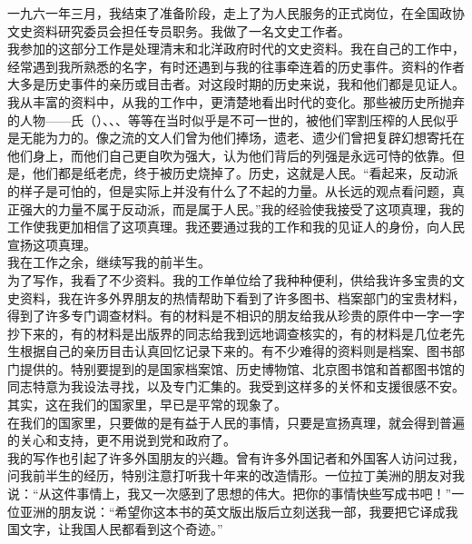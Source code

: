一九六一年三月，我结束了准备阶段，走上了为人民服务的正式岗位，在全国政协文史资料研究委员会担任专员职务。我做了一名文史工作者。\\

我参加的这部分工作是处理清末和北洋政府时代的文史资料。我在自己的工作中，经常遇到我所熟悉的名字，有时还遇到与我的往事牵连着的历史事件。资料的作者大多是历史事件的亲历或目击者。对这段时期的历史来说，我和他们都是见证人。我从丰富的资料中，从我的工作中，更清楚地看出时代的变化。那些被历史所抛弃的人物——氏（）、、、等等在当时似乎是不可一世的，被他们宰割压榨的人民似乎是无能为力的。像之流的文人们曾为他们捧场，遗老、遗少们曾把复辟幻想寄托在他们身上，而他们自己更自吹为强大，认为他们背后的列强是永远可恃的依靠。但是，他们都是纸老虎，终于被历史烧掉了。历史，这就是人民。“看起来，反动派的样子是可怕的，但是实际上并没有什么了不起的力量。从长远的观点看问题，真正强大的力量不属于反动派，而是属于人民。”我的经验使我接受了这项真理，我的工作使我更加相信了这项真理。我还要通过我的工作和我的见证人的身份，向人民宣扬这项真理。\\

我在工作之余，继续写我的前半生。\\

为了写作，我看了不少资料。我的工作单位给了我种种便利，供给我许多宝贵的文史资料，我在许多外界朋友的热情帮助下看到了许多图书、档案部门的宝贵材料，得到了许多专门调查材料。有的材料是不相识的朋友给我从珍贵的原件中一字一字抄下来的，有的材料是出版界的同志给我到远地调查核实的，有的材料是几位老先生根据自己的亲历目击认真回忆记录下来的。有不少难得的资料则是档案、图书部门提供的。特别要提到的是国家档案馆、历史博物馆、北京图书馆和首都图书馆的同志特意为我设法寻找，以及专门汇集的。我受到这样多的关怀和支援很感不安。其实，这在我们的国家里，早已是平常的现象了。\\

在我们的国家里，只要做的是有益于人民的事情，只要是宣扬真理，就会得到普遍的关心和支持，更不用说到党和政府了。\\

我的写作也引起了许多外国朋友的兴趣。曾有许多外国记者和外国客人访问过我，问我前半生的经历，特别注意打听我十年来的改造情形。一位拉丁美洲的朋友对我说：“从这件事情上，我又一次感到了思想的伟大。把你的事情快些写成书吧！”一位亚洲的朋友说：“希望你这本书的英文版出版后立刻送我一部，我要把它译成我国文字，让我国人民都看到这个奇迹。”\\

